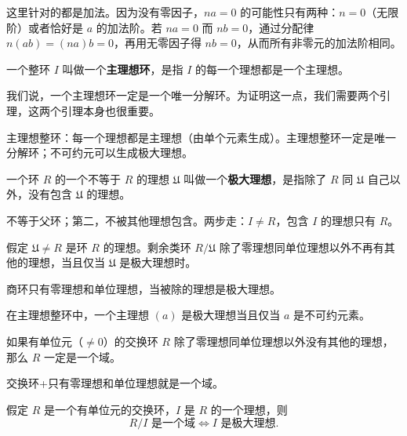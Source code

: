 \begin{note}[无零因子环阶相同的证明思路]
这里针对的都是加法。因为没有零因子，$na=0$ 的可能性只有两种：$n=0$（无限阶）或者恰好是 $a$ 的加法阶。若 $na=0$ 而 $nb=0$，通过分配律 $n(ab)=(na)b=0$，再用无零因子得 $nb=0$，从而所有非零元的加法阶相同。
\end{note}

\begin{definition}[主理想环的定义]
一个整环 $I$ 叫做一个\textbf{主理想环}，是指 $I$ 的每一个理想都是一个主理想。

我们说，一个主理想环一定是一个唯一分解环。为证明这一点，我们需要两个引理，这两个引理本身也很重要。
\end{definition}

\begin{note}[定义2 25主理想整环]
主理想整环：每一个理想都是主理想（由单个元素生成）。主理想整环一定是唯一分解环；不可约元可以生成极大理想。
\end{note}

\begin{definition}[极大理想的定义]
一个环 $R$ 的一个不等于 $R$ 的理想 $\mathfrak{U}$ 叫做一个\textbf{极大理想}，是指除了 $R$ 同 $\mathfrak{U}$ 自己以外，没有包含 $\mathfrak{U}$ 的理想。

不等于父环；第二，不被其他理想包含。两步走：$I\ne R$，包含 $I$ 的理想只有 $R$。
\end{definition}

\begin{lemma}[引理 1：极大理想对剩余类环充要]
假定 $\mathfrak{U}\ne R$ 是环 $R$ 的理想。剩余类环 $R/\mathfrak{U}$ 除了零理想同单位理想以外不再有其他的理想，当且仅当 $\mathfrak{U}$ 是极大理想时。

商环只有零理想和单位理想，当被除的理想是极大理想。
\end{lemma}

\begin{note}
在主理想整环中，一个主理想 $(a)$ 是极大理想当且仅当 $a$ 是不可约元素。
\end{note}

\begin{lemma}
如果有单位元（$\ne 0$）的交换环 $R$ 除了零理想同单位理想以外没有其他的理想，那么 $R$ 一定是一个域。

交换环+只有零理想和单位理想就是一个域。
\end{lemma}

\begin{theorem}[极大理想与域]
假定 $R$ 是一个有单位元的交换环，$I$ 是 $R$ 的一个理想，则
\[
R/I\text{ 是一个域}\iff I\text{ 是极大理想}.
\]
\end{theorem}

